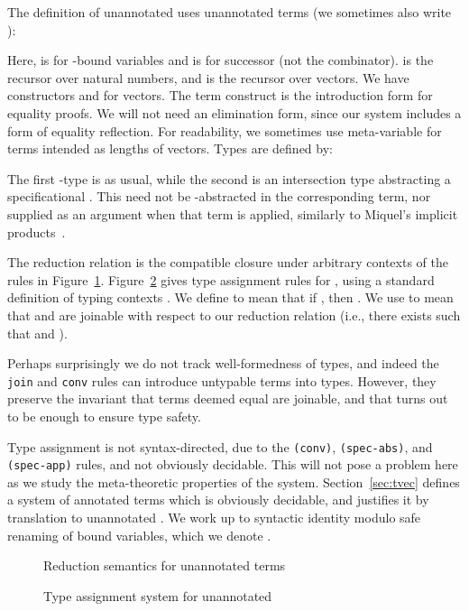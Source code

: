 \documentclass[copyright]{eptcs}
\begin{document}
The definition of unannotated  uses  unannotated terms  (we
sometimes also write ):

\noindent Here,  is for -bound variables and  is for
successor (not the  combinator).   is the recursor over
natural numbers, and  is the recursor over vectors.  We have
constructors  and  for vectors.  The term construct
 is the introduction form for equality proofs.  We will not
need an elimination form, since our system includes a form of equality
reflection.  For readability, we sometimes use meta-variable  for
terms  intended as lengths of vectors.  Types  are defined
by:

\noindent The first -type is as usual, while the second is an
intersection type abstracting a specificational .  This  need
not be -abstracted in the corresponding term, nor supplied as
an argument when that term is applied, similarly to Miquel's implicit
products~\cite{miquel01}. 

The reduction relation is the compatible closure under arbitrary
contexts of the rules in Figure~\ref{fig:red}.
Figure~\ref{fig:typing} gives type assignment rules for , using
a standard definition of typing contexts .  We define
 to mean that if
, then
. We use  to mean that  and  are joinable with respect to our
reduction relation (i.e., there exists  such that
 and ).

Perhaps surprisingly we do not track well-formedness of types, and
indeed the \texttt{join} and \texttt{conv} rules can introduce
untypable terms into types. However, they preserve the invariant
that terms deemed equal are joinable, and that turns out to
be enough to ensure type safety.

Type assignment is not syntax-directed, due to the \texttt{(conv)},
\texttt{(spec-abs)}, and \texttt{(spec-app)} rules, and not obviously
decidable.  This will not pose a problem here as we study the
meta-theoretic properties of the system.  Section~\ref{sec:tvec}
defines a system of annotated terms which is obviously decidable, and
justifies it by translation to unannotated .  We work up to
syntactic identity modulo safe renaming of bound variables, which we
denote .

\begin{figure}

\caption{Reduction semantics for unannotated  terms}
\label{fig:red}
\end{figure}

\begin{figure}

\caption{Type assignment system for unannotated }
\label{fig:typing}
\end{figure}
\end{document}
